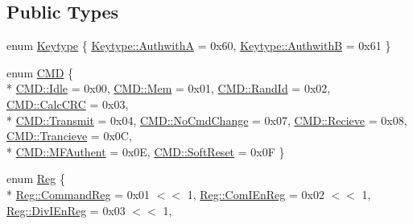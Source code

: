 \subsection*{Public Types}
\begin{DoxyCompactItemize}
\item 
enum \hyperlink{class_r_c522_a3dcadf9d9544de3a436a34018dea676b}{Keytype} \{ \hyperlink{class_r_c522_a3dcadf9d9544de3a436a34018dea676ba1e7b8f8d328f24fb6773e9656f1ed5be}{Keytype\+::\+AuthwithA} = 0x60, 
\hyperlink{class_r_c522_a3dcadf9d9544de3a436a34018dea676baceae6de53afe58721569fa62b289a3cd}{Keytype\+::\+AuthwithB} = 0x61
 \}
\item 
enum \hyperlink{class_r_c522_a8d2b2b09cb1978142f8c31b89049d968}{C\+MD} \{ \\*
\hyperlink{class_r_c522_a8d2b2b09cb1978142f8c31b89049d968ae599161956d626eda4cb0a5ffb85271c}{C\+M\+D\+::\+Idle} = 0x00, 
\hyperlink{class_r_c522_a8d2b2b09cb1978142f8c31b89049d968adba5553473d129a7985fb532dc249ff4}{C\+M\+D\+::\+Mem} = 0x01, 
\hyperlink{class_r_c522_a8d2b2b09cb1978142f8c31b89049d968a0f15bdc78a60f6b39a945102fb09e119}{C\+M\+D\+::\+Rand\+Id} = 0x02, 
\hyperlink{class_r_c522_a8d2b2b09cb1978142f8c31b89049d968a3b8f7ce3dcfe31207ffafa7a9226411b}{C\+M\+D\+::\+Calc\+C\+RC} = 0x03, 
\\*
\hyperlink{class_r_c522_a8d2b2b09cb1978142f8c31b89049d968a6c2958de5e2295b8cb67bac908244879}{C\+M\+D\+::\+Transmit} = 0x04, 
\hyperlink{class_r_c522_a8d2b2b09cb1978142f8c31b89049d968a523f1f3bda25793f86274cedffbaf328}{C\+M\+D\+::\+No\+Cmd\+Change} = 0x07, 
\hyperlink{class_r_c522_a8d2b2b09cb1978142f8c31b89049d968aac3e7dbb9d8e868b27d027b446205fb7}{C\+M\+D\+::\+Recieve} = 0x08, 
\hyperlink{class_r_c522_a8d2b2b09cb1978142f8c31b89049d968a78ce6db44d32bafcbbe666722f86e46a}{C\+M\+D\+::\+Trancieve} = 0x0C, 
\\*
\hyperlink{class_r_c522_a8d2b2b09cb1978142f8c31b89049d968abc03250648b1ad2b406fe3f4934b98b7}{C\+M\+D\+::\+M\+F\+Authent} = 0x0E, 
\hyperlink{class_r_c522_a8d2b2b09cb1978142f8c31b89049d968a109e0d0bf2b42091e997ddc4d49bab8d}{C\+M\+D\+::\+Soft\+Reset} = 0x0F
 \}
\item 
enum \hyperlink{class_r_c522_a7bf90c1bc00e047a687a30948f18a431}{Reg} \{ \\*
\hyperlink{class_r_c522_a7bf90c1bc00e047a687a30948f18a431a11450bdf07b4ea5cc6ad0e81c8d44527}{Reg\+::\+Command\+Reg} = 0x01 $<$$<$ 1, 
\hyperlink{class_r_c522_a7bf90c1bc00e047a687a30948f18a431a1845d2c6205cbc45e80752935163eb9b}{Reg\+::\+Com\+I\+En\+Reg} = 0x02 $<$$<$ 1, 
\hyperlink{class_r_c522_a7bf90c1bc00e047a687a30948f18a431aab1dc60f00e0544f9497198c1d3fae89}{Reg\+::\+Div\+I\+En\+Reg} = 0x03 $<$$<$ 1, 
$$
\end{DoxyCompactItemize}
